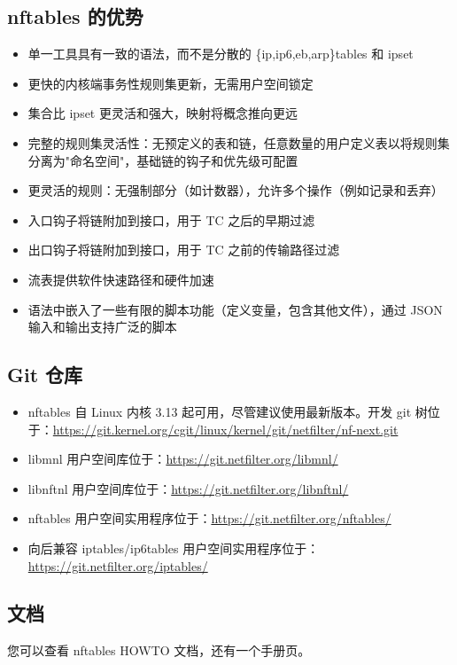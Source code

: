 \documentclass[12pt,UTF8]{ctexbook}
\begin{document}
\subsection{nftables 的优势}
\begin{itemize}
  \item 单一工具具有一致的语法，而不是分散的 \{ip,ip6,eb,arp\}tables 和 ipset
  \item 更快的内核端事务性规则集更新，无需用户空间锁定
  \item 集合比 ipset 更灵活和强大，映射将概念推向更远
  \item 完整的规则集灵活性：无预定义的表和链，任意数量的用户定义表以将规则集分离为"命名空间"，基础链的钩子和优先级可配置
  \item 更灵活的规则：无强制部分（如计数器），允许多个操作（例如记录和丢弃）
  \item 入口钩子将链附加到接口，用于 TC 之后的早期过滤
  \item 出口钩子将链附加到接口，用于 TC 之前的传输路径过滤
  \item 流表提供软件快速路径和硬件加速
  \item 语法中嵌入了一些有限的脚本功能（定义变量，包含其他文件），通过 JSON 输入和输出支持广泛的脚本
\end{itemize}

\subsection{Git 仓库}
\begin{itemize}
  \item nftables 自 Linux 内核 3.13 起可用，尽管建议使用最新版本。开发 git 树位于：\url{https://git.kernel.org/cgit/linux/kernel/git/netfilter/nf-next.git}
  \item libmnl 用户空间库位于：\url{https://git.netfilter.org/libmnl/}
  \item libnftnl 用户空间库位于：\url{https://git.netfilter.org/libnftnl/}
  \item nftables 用户空间实用程序位于：\url{https://git.netfilter.org/nftables/}
  \item 向后兼容 iptables/ip6tables 用户空间实用程序位于：\url{https://git.netfilter.org/iptables/}
\end{itemize}

\subsection{文档}
您可以查看 nftables HOWTO 文档，还有一个手册页。
\end{document}
